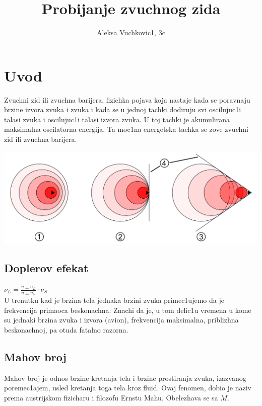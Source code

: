 \documentclass[11pt]{article}
\title{\bf{Probijanje zvuchnog zida}}
\author{\Large Aleksa Vuchkovic1, 3c}
\date{}
\begin{document}
\maketitle
\large
\section{Uvod}
Zvuchni zid ili zvuchna barijera, fizichka pojava koja nastaje kada se poravnaju brzine izvora zvuka i zvuka i kada se u jednoj tachki dodiruju svi oscilujuc1i talasi zvuka i oscilujuc1i talasi izvora zvuka. U toj tachki je akumulirana maksimalna oscilatorna energija. Ta moc1na energet\/ska tachka se zove zvuchni zid ili zvuchna barijera.

\begin{center}
    \includegraphics[scale=0.4]{Sound_barrier_chart.png}
\end{center}

\subsection{Doplerov efekat}
$\nu_L=\displaystyle\frac{u\pm u_L}{u\pm u_S}\cdot \nu_S$\\

U trenutku kad je brzina tela jednaka brzini zvuka primec1ujemo da je frekvencija primaoca beskonachna. Znachi da je, u tom delic1u vremena u kome su jednaki brzina zvuka i izvora (avion), frekvencija maksimalna, priblizhna beskonachnoj, pa otuda fatalno razorna.\\

\subsection{Mahov broj}
Mahov broj je odnos brzine kretanja tela i brzine prostiranja zvuka, izazvanog poremec1ajem, usled kretanja toga tela kroz fluid. Ovaj fenomen, dobio je naziv prema austrijskom fizicharu i filozofu Ernstu Mahu. Obelezhava se sa $M$.\\
\end{document}
